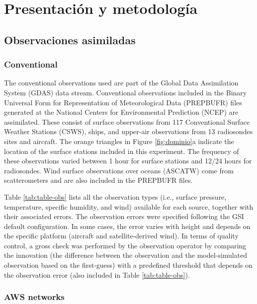 \documentclass[12pt,twoside]{reedthesis}
\begin{document}
\hypertarget{presentaciuxf3n-y-metodologuxeda}{%
\section{Presentación y metodología}\label{presentaciuxf3n-y-metodologuxeda}}

\hypertarget{observaciones-asimiladas}{%
\subsection{Observaciones asimiladas}\label{observaciones-asimiladas}}

\hypertarget{conventional}{%
\subsubsection{Conventional}\label{conventional}}

The conventional observations used are part of the Global Data Assimilation System (GDAS) data stream. Conventional observations included in the Binary Universal Form for Representation of Meteorological Data (PREPBUFR) files generated at the National Centers for Environmental Prediction (NCEP) are assimilated. These consist of surface observations from 117 Conventional Surface Weather Stations (CSWS), ships, and upper-air observations from 13 radiosondes sites and aircraft. The orange triangles in Figure \ref{fig:dominio}a indicate the location of the surface stations included in this experiment. The frequency of these observations varied between 1 hour for surface stations and 12/24 hours for radiosondes. Wind surface observations over oceans (ASCATW) come from scatterometers and are also included in the PREPBUFR files.

Table \ref{tab:table-obs} lists all the observation types (i.e., surface pressure, temperature, specific humidity, and wind) available for each source, together with their associated errors. The observation errors were specified following the GSI default configuration. In some cases, the error varies with height and depends on the specific platform (aircraft and satellite-derived wind). In terms of quality control, a gross check was performed by the observation operator by comparing the innovation (the difference between the observation and the model-simulated observation based on the first-guess) with a predefined threshold that depends on the observation error (also included in Table \ref{tab:table-obs}).

\hypertarget{aws-networks}{%
\subsubsection{AWS networks}\label{aws-networks}}
\end{document}
